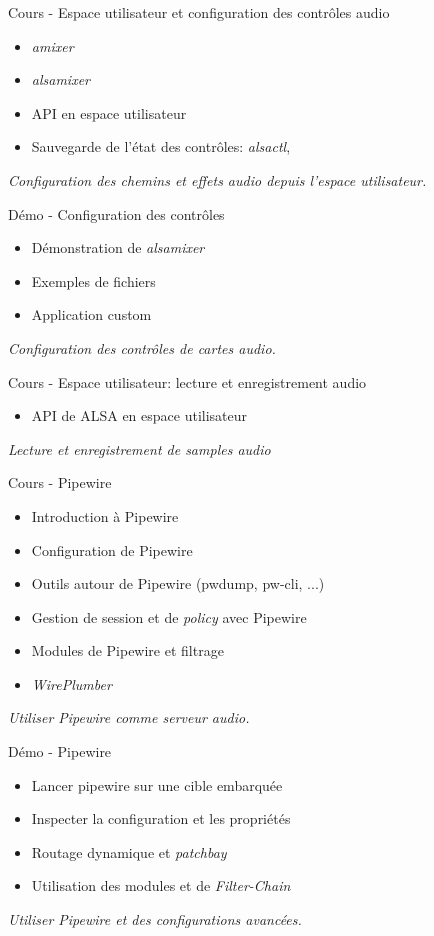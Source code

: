 \documentclass[a4paper,12pt,obeyspaces,spaces,hyphens]{article}
\begin{document}
\feagendatwocolumn
{Cours - Espace utilisateur et configuration des contrôles audio}
{
  \begin{itemize}
  \item {\em amixer}
  \item {\em alsamixer}
  \item API en espace utilisateur
  \item Sauvegarde de l'état des contrôles: {\em alsactl}, 
  \end{itemize}
  \vspace{0.5em}
  {\em Configuration des chemins et effets audio depuis l'espace utilisateur.}
}
{Démo - Configuration des contrôles}
{
  \begin{itemize}
  \item Démonstration de {\em alsamixer}
  \item Exemples de fichiers 
  \item Application custom
  \end{itemize}
  \vspace{0.5em}
  {\em Configuration des contrôles de cartes audio.}
}

\feagendaonecolumn
{Cours - Espace utilisateur: lecture et enregistrement audio}
{
  \begin{itemize}
  \item API de ALSA en espace utilisateur
  \end{itemize}
  \vspace{0.5em}
  {\em Lecture et enregistrement de samples audio}
}

\feagendatwocolumn
{Cours - Pipewire}
{
  \begin{itemize}
  \item Introduction à Pipewire
  \item Configuration de Pipewire
  \item Outils autour de Pipewire (pwdump, pw-cli, ...)
  \item Gestion de session et de {\em policy} avec Pipewire
  \item Modules de Pipewire et filtrage
  \item {\em WirePlumber}
  \end{itemize}
  \vspace{0.5em}
  {\em Utiliser Pipewire comme serveur audio.}
}
{Démo - Pipewire}
{
  \begin{itemize}
  \item Lancer pipewire sur une cible embarquée
  \item Inspecter la configuration et les propriétés
  \item Routage dynamique et {\em patchbay}
  \item Utilisation des modules et de {\em Filter-Chain}
  \end{itemize}
  \vspace{0.5em}
  {\em Utiliser Pipewire et des configurations avancées.}
}
\end{document}
